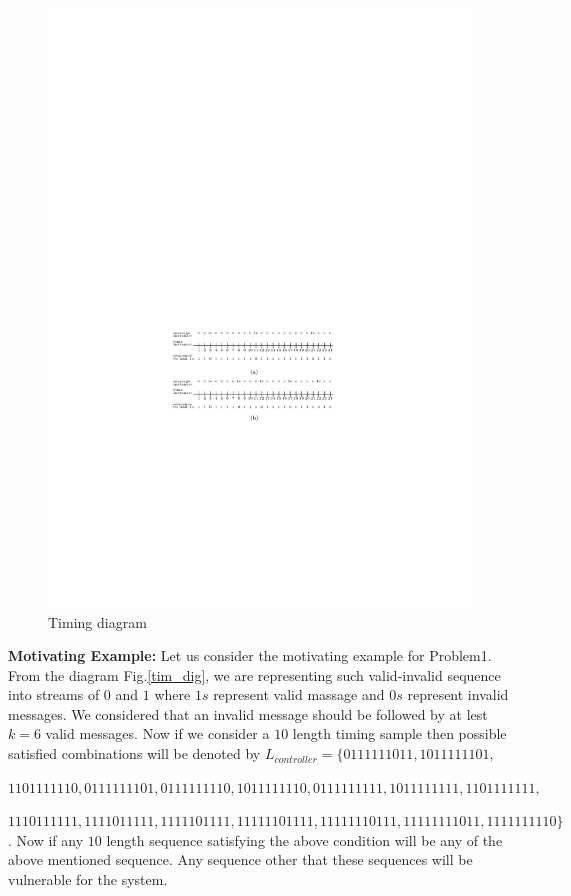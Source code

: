\begin{figure}
\begin{center}
\includegraphics[width = 120mm]{vali_invalid_0_1.pdf}
\end{center}
\caption{Timing diagram}
\label{tim_dig_01}
\end{figure}

\textbf{Motivating Example:}
Let us consider the motivating example for Problem1. From the diagram Fig.\ref{tim_dig}, we  are representing
such valid-invalid sequence into streams of $0$ and $1$ where $1s$ represent valid massage
and $0s$ represent invalid messages. We considered that an invalid
message should be followed by at lest $k = 6$ valid messages. Now if we consider a $10$
length timing sample then possible satisfied combinations will be denoted by $L_{controller}
= \{ 0111111011, 1011111101,$ 

$1101111110, 0111111101, 0111111110, 1011111110, 0111111111, 1011111111, 1101111111,$ 

$1110111111, 1111011111, 1111101111, 11111101111, 11111110111, 11111111011, 1111111110\}$. Now if any $10$ 
length sequence satisfying the above condition will be any of the above mentioned sequence.
Any sequence other that these sequences will be vulnerable for the system.

